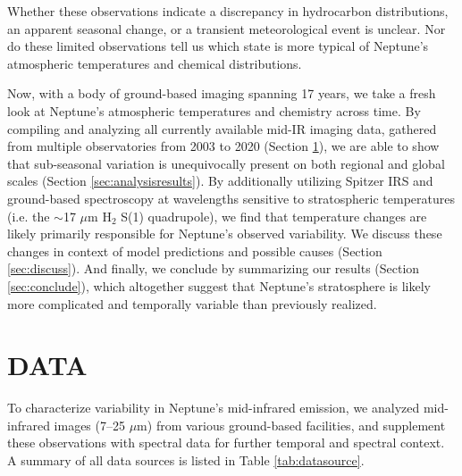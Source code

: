 \documentclass[twocolumn,10pt]{aastex631}
\begin{document}
Whether these observations indicate a discrepancy in hydrocarbon distributions, an apparent seasonal change, or a transient meteorological event is unclear.  Nor do these limited observations tell us which state is more typical of Neptune’s atmospheric temperatures and chemical distributions.  

Now, with a body of ground-based imaging spanning 17 years, we take a fresh look at Neptune’s atmospheric temperatures and chemistry across time.  By compiling and analyzing all currently available mid-IR imaging data, gathered from multiple observatories from 2003 to 2020 (Section \ref{sec:data}), we are able to show that sub-seasonal variation is unequivocally present on both regional and global scales (Section \ref{sec:analysisresults}). By additionally utilizing Spitzer IRS and ground-based spectroscopy at wavelengths sensitive to stratospheric temperatures (i.e. the $\sim$17 $\mu$m H$_2$ S(1) quadrupole), we find that temperature changes are likely primarily responsible for Neptune’s observed variability.  We discuss these changes in context of model predictions and possible causes (Section \ref{sec:discuss}).  And finally, we conclude by summarizing our results (Section \ref{sec:conclude}), which altogether suggest that Neptune’s stratosphere is likely more complicated and temporally variable than previously realized.

\section{DATA} \label{sec:data}

To characterize variability in Neptune's mid-infrared emission, we analyzed mid-infrared images (7--25 $\mu$m) from various ground-based facilities, and supplement these observations with spectral data for further temporal and spectral context. A summary of all data sources is listed in Table \ref{tab:datasource}.
\end{document}
